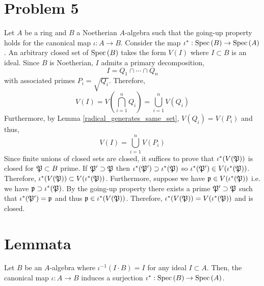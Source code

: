 \documentclass[12pt]{extarticle}
\begin{document}
\section*{Problem 5}

Let $A$ be a ring and $B$ a Noetherian $A$-algebra such that the going-up property holds for the canonical map $\iota : A \to B$. Consider the map $\iota^* : \Spec{B} \to \Spec{A}$. An arbitrary closed set of $\Spec{B}$ takes the form $V(I)$ where $I \subset B$ is an ideal. Since $B$ is Noetherian, $I$ admits a primary decomposition,
\[ I = Q_1 \cap \cdots \cap Q_n \]
with associated primes $P_i = \sqrt{Q_i}$. Therefore,
\[ V(I) = V\left( \bigcap_{i = 1}^n Q_i \right) = \bigcup_{i = 1}^n V(Q_i) \]
Furthermore, by Lemma \ref{radical_generates_same_set}, $V(Q_i) = V(P_i)$ and thus,
\[ V(I) = \bigcup_{i = 1}^n V(P_i) \]
Since finite unions of closed sets are closed, it suffices to prove that $\iota^*(V(\P))$ is closed for $\P \subset B$ prime. If $\P' \supset \P$ then $\iota^*(\P') \supset \iota^*(\P)$ so $\iota^*(\P') \in V(\iota^*(\P))$. Therefore, $\iota^*(V(\P)) \subset V(\iota^*(\P))$. Furthermore, suppose we have $\p \in V(\iota^*(\P))$ i.e. we have $\p \supset \iota^*(\P)$. By the going-up property there exists a prime $\P' \supset \P$ such that $\iota^*(\P') = \p$ and thus $\p \in \iota^*(V(\P))$. Therefore, $\iota^*(V(\P)) = V(\iota^*(\P))$ and is closed. 

\section{Lemmata}

\begin{lemma} \label{intersection_ideal_property_implies_spec_surjection}
Let $B$ be an $A$-algebra where $\iota^{-1}(I \cdot B) = I$ for any ideal $I \subset A$. Then, the canonical map $\iota : A \to B$ induces a surjection $\iota^* : \Spec{B} \to \Spec{A}$. 
\end{lemma}
\end{document}
